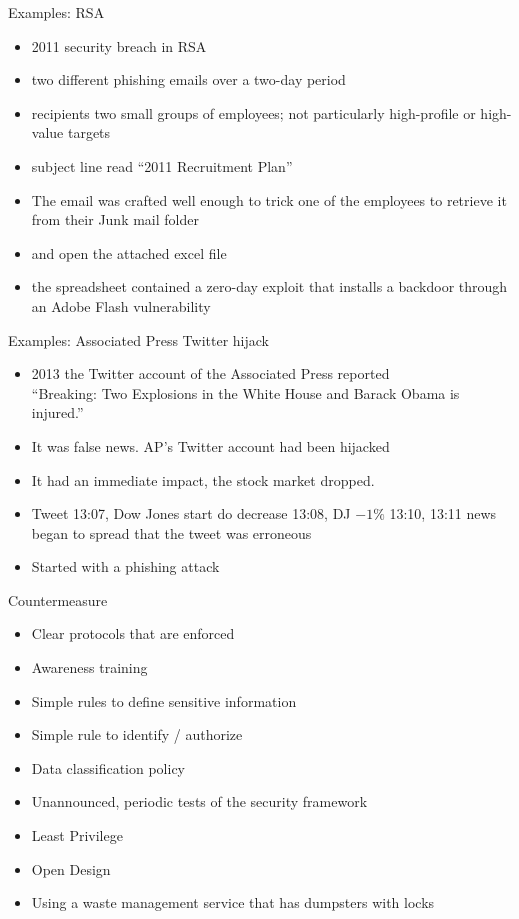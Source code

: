 \documentclass{beamer}
\begin{document}
\begin{frame}{Examples: RSA}
  \begin{itemize}
    \item 2011 security breach in RSA
    \item two different phishing emails over a two-day period
    \item recipients two small groups of employees; not particularly
      high-profile or high-value targets
    \item subject line read ``2011 Recruitment Plan''
    \item The email was crafted well enough to trick one of the
      employees to retrieve it from their Junk mail folder
    \item and open the attached excel file
    \item the spreadsheet contained a zero-day exploit that installs a backdoor through an Adobe Flash vulnerability
  \end{itemize}
\end{frame}

\begin{frame}{Examples: Associated Press Twitter hijack}
  \begin{itemize}
    \item 2013 the Twitter account of the Associated Press reported\\
      ``Breaking: Two Explosions in the White House and Barack Obama
      is injured.''
    \item It was false news. AP's Twitter account had been hijacked
    \item It had an immediate impact, the stock market dropped.
    \item Tweet 13:07, Dow Jones start do decrease 13:08, DJ $-1\%$
      13:10, 13:11 news began to spread that the tweet was erroneous
    \item Started with a phishing attack
  \end{itemize}
\end{frame}


\begin{frame}{Countermeasure}
  \begin{itemize}
    \item Clear protocols that are enforced
    \item Awareness training
    \item Simple rules to define sensitive information
    \item Simple rule to identify / authorize
    \item Data classification policy
    \item Unannounced, periodic tests of the security framework
    \item Least Privilege
    \item Open Design
    \item<2-> Using a waste management service that has dumpsters with locks
  \end{itemize}
\end{frame}
\end{document}
